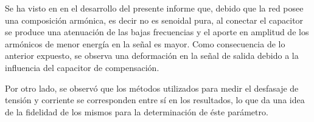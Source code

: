     Se ha visto en en el desarrollo del presente informe que, debido que la red posee una composición 
    armónica, es decir no es senoidal pura, al conectar el capacitor se produce una atenuación de 
    las bajas frecuencias y el aporte en amplitud de los armónicos de menor energía en la señal es 
    mayor. Como consecuencia de lo anterior expuesto, se observa una deformación en la señal de 
    salida debido a la influencia del capacitor de compensación.

    Por otro lado, se observó que los métodos utilizados para medir el desfasaje de tensión y 
    corriente se corresponden entre sí en los resultados, lo que da una idea de la fidelidad 
    de los mismos para la determinación de éste parámetro.


    

    
